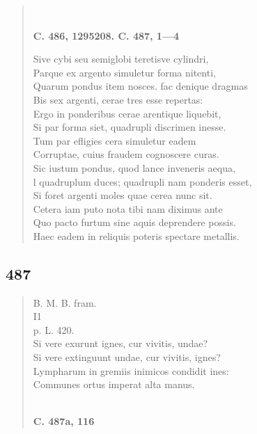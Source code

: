 \documentclass[11pt, a4paper]{report}
\begin{document}
\begin{verse}
        ﻿\pagebreak 
    \begin{center} \textbf{C. 486, 1295208. C. 487, 1—4} \end{center} \marginpar{[4]} Sive cybi seu semiglobi teretisve cylindri, \\ Parque ex argento simuletur forma nitenti, \\ Quarum pondus item nosces. fac denique dragmas \\ Bis sex argenti, cerae tres esse repertas: \\ Ergo in ponderibus cerae arentique liquebit, \\ Si par forma siet, quadrupli discrimen inesse. \\ Tum par efligies cera simuletur eadem \\ Corruptae, cuius fraudem cognoscere curas. \\ Sic iustum pondus, quod lance inveneris aequa, \\ l quadruplum duces; quadrupli nam ponderis esset, \\ Si foret argenti moles quae cerea nunc sit. \\ Cetera iam puto nota tibi nam diximus ante \\ Quo pacto furtum sine aquis deprendere possis. \\ Haec eadem in reliquis poteris spectare metallis. \\ 
      \end{verse}
  
            \subsection*{487}
      \begin{verse}
      B. M. B. fram. \\ I1 \\ p. L. 420. \\ Si vere exurunt ignes, cur vivitis, undae? \\ Si vere extinguunt undae, cur vivitis, ignes? \\ Lympharum in gremiis inimicos condidit ines: \\ Communes ortus imperat alta manus. \\ 
        ﻿\pagebreak 
    \begin{center} \textbf{C. 487a, 116} \end{center} \marginpar{[38]} 
      \end{verse}
  
\end{document}
